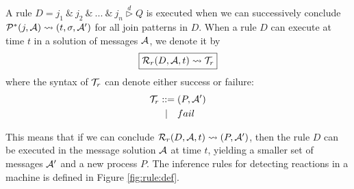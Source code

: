 A rule $D = j_1~\&~j_2~\&~...~\&~j_n \stackrel{d}{\triangleright}Q$ is
executed when we can successively conclude $\mathcal{P}^*(j,\mathcal{A}) \leadsto (t,
\sigma, \mathcal{A}')$ for all join patterns in $D$. When a rule $D$ can execute at time
$t$ in a solution of messages $\mathcal{A}$, we denote it by
\begin{equation*}
\boxed{\mathcal{R}_r(D,\mathcal{A},t) \leadsto \mathcal{T}_r}
\end{equation*}
where the syntax of $\mathcal{T}_r$ can denote either success or failure:
\begin{align*}
\mathcal{T}_r ::={}& (P,\mathcal{A}')\\
    |\quad& fail
\end{align*}

This means that if we can conclude $\mathcal{R}_r(D,\mathcal{A},t) \leadsto (P,\mathcal{A}')$, then the
rule $D$ can be executed in the message solution $\mathcal{A}$ at time $t$, yielding a
smaller set of messages $\mathcal{A}'$ and a new process $P$. The inference rules for
detecting reactions in a machine is defined in Figure \ref{fig:rule:def}.

